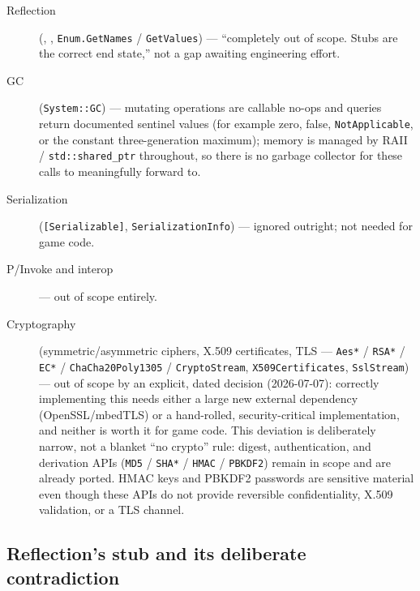 \begin{description}
  \item[Reflection] (, ,
  \texttt{Enum.GetNames} / \texttt{GetValues}) --- ``completely out of scope. Stubs are the
  correct end state,'' not a gap awaiting engineering effort.
  \item[GC] (\texttt{System::GC}) --- mutating operations are callable no-ops and queries return
  documented sentinel values (for example zero, false, \texttt{NotApplicable}, or the constant
  three-generation maximum); memory is managed by RAII / \texttt{std::shared\_ptr} throughout,
  so there is no garbage collector for these calls to meaningfully forward to.
  \item[Serialization] (\texttt{[Serializable]}, \texttt{SerializationInfo}) --- ignored
  outright; not needed for game code.
  \item[P/Invoke and interop] --- out of scope entirely.
  \item[Cryptography] (symmetric/asymmetric ciphers, X.509 certificates, TLS ---
  \texttt{Aes*} / \texttt{RSA*} / \texttt{EC*} / \texttt{ChaCha20Poly1305} / \texttt{CryptoStream},
  \texttt{X509Certificates}, \texttt{SslStream}) --- out of scope by an explicit, dated decision
  (2026-07-07): correctly implementing this needs either a large new external dependency
  (OpenSSL/mbedTLS) or a hand-rolled, security-critical implementation, and neither is worth it
  for game code. This deviation is deliberately narrow, not a blanket ``no crypto'' rule:
  digest, authentication, and derivation APIs (\texttt{MD5} / \texttt{SHA*} / \texttt{HMAC} /
  \texttt{PBKDF2}) remain in scope and are already ported. HMAC keys and PBKDF2 passwords are
  sensitive material even though these APIs do not provide reversible confidentiality, X.509
  validation, or a TLS channel.
\end{description}

\subsection{Reflection's stub and its deliberate contradiction}

